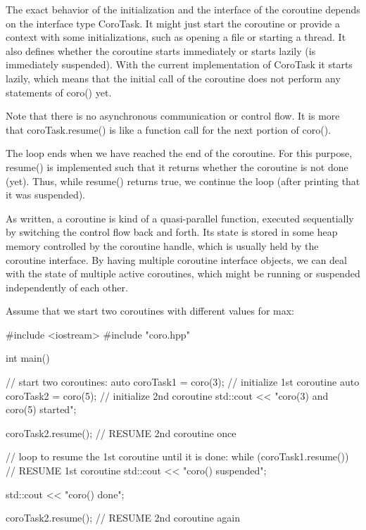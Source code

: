 The exact behavior of the initialization and the interface of the coroutine depends on the interface type CoroTask. It might just start the coroutine or provide a context with some initializations, such as opening a file or starting a thread. It also defines whether the coroutine starts immediately or starts lazily (is immediately suspended). With the current implementation of CoroTask it starts lazily, which means that the initial call of the coroutine does not perform any statements of coro() yet.

Note that there is no asynchronous communication or control flow. It is more that coroTask.resume() is like a function call for the next portion of coro().

The loop ends when we have reached the end of the coroutine. For this purpose, resume() is implemented such that it returns whether the coroutine is not done (yet). Thus, while resume() returns true, we continue the loop (after printing that it was suspended).


As written, a coroutine is kind of a quasi-parallel function, executed sequentially by switching the control flow back and forth. Its state is stored in some heap memory controlled by the coroutine handle, which is usually held by the coroutine interface. By having multiple coroutine interface objects, we can deal with the state of multiple active coroutines, which might be running or suspended independently of each other.

Assume that we start two coroutines with different values for max:


\begin{cpp}
#include <iostream>
#include "coro.hpp"

int main()
{
	// start two coroutines:
	auto coroTask1 = coro(3); // initialize 1st coroutine
	auto coroTask2 = coro(5); // initialize 2nd coroutine
	std::cout << "coro(3) and coro(5) started\n";
	
	coroTask2.resume(); // RESUME 2nd coroutine once
	
	// loop to resume the 1st coroutine until it is done:
	while (coroTask1.resume()) { // RESUME 1st coroutine
		std::cout << "coro() suspended\n";
	}
	
	std::cout << "coro() done\n";
	
	coroTask2.resume(); // RESUME 2nd coroutine again
}
\end{cpp}


